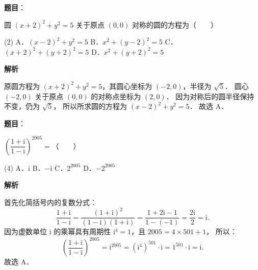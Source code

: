 
\begin{answer}

\textbf{题目}：

圆 $(x + 2)^2 + y^2 = 5$ 关于原点 $(0, 0)$ 对称的圆的方程为\mbox{（　　）}

\begin{gkopts}(2)
\task A．$(x - 2)^2 + y^2 = 5$
\task B．$x^2 + (y - 2)^2 = 5$
\task C．$(x + 2)^2 + (y + 2)^2 = 5$
\task D．$x^2 + (y + 2)^2 = 5$
\end{gkopts}

\textbf{解析}

原圆方程为 $(x + 2)^2 + y^2 = 5$，其圆心坐标为 $(-2, 0)$，半径为 $\sqrt{5}$．
圆心 $(-2, 0)$ 关于原点 $(0, 0)$ 的对称点坐标为 $(2, 0)$．
因为对称后的圆半径保持不变，仍为 $\sqrt{5}$，
所以所求圆的方程为 $(x - 2)^2 + y^2 = 5$．
故选 A．


\end{answer}
\begin{answer}

\textbf{题目}：

$\left(\dfrac{1 + \mathrm{i}}{1 - \mathrm{i}}\right)^{2005} =$\mbox{（　　）}

\begin{gkopts}(4)
\task A．$\mathrm{i}$
\task B．$-\mathrm{i}$
\task C．$2^{2005}$
\task D．$-2^{2005}$
\end{gkopts}

\textbf{解析}

首先化简括号内的复数分式：
\nopagebreak[4]
\[
\frac{1 + \mathrm{i}}{1 - \mathrm{i}} = \frac{(1 + \mathrm{i})^2}{(1 - \mathrm{i})(1 + \mathrm{i})} = \frac{1 + 2\mathrm{i} - 1}{1 - (-1)} = \frac{2\mathrm{i}}{2} = \mathrm{i}.
\]
因为虚数单位 $\mathrm{i}$ 的乘幂具有周期性 $\mathrm{i}^4 = 1$，且 $2005 = 4 \times 501 + 1$，
所以：
\nopagebreak[4]
\[
\left(\frac{1 + \mathrm{i}}{1 - \mathrm{i}}\right)^{2005} = \mathrm{i}^{2005} = (\mathrm{i}^4)^{501} \cdot \mathrm{i} = 1^{501} \cdot \mathrm{i} = \mathrm{i}.
\]
故选 A．


\end{answer}
